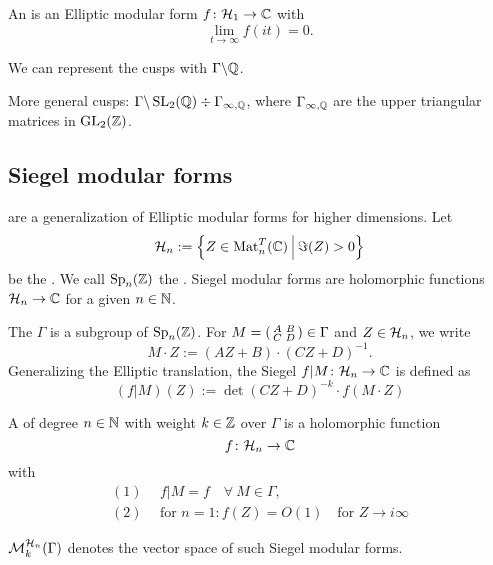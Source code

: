 An  is an Elliptic modular form $f \colon \mathcal{H}_1 \rightarrow \mathbb{C}$ with
\[ \lim_{t \rightarrow \infty} f(i t) = 0 . \]

We can represent the cusps with $\Gamma \backslash \mathbb{Q}$.

More general cusps: $\Gamma \backslash \operatorname{SL}_2(\mathbb{Q}) \div \Gamma_{\infty, \mathbb{Q}}$, where $\Gamma_{\infty, \mathbb{Q}}$ are the upper triangular matrices in $\operatorname{GL}_2(\mathbb{Z})$.


\subsection{Siegel modular forms}

 are a generalization of Elliptic modular forms for higher dimensions.
Let
\[ \SiegelHalfPlane_n := \Set{Z \in \M_n^T(\C)}{\Im(Z) > 0} \]
be the .
We call $\operatorname{Sp}_n(\mathbb{Z})$ the .
Siegel modular forms are holomorphic functions $\mathcal{H}_n \rightarrow \mathbb{C}$ for a given  $n \in \mathbb{N}$.

The  $\Gamma$ is a subgroup of $\operatorname{Sp}_n(\mathbb{Z})$. For $M = \left( \begin{smallmatrix} A & B \\ C & D \end{smallmatrix} \right) \in \Gamma$ and $Z \in \mathcal{H}_n$, we write
\[ M \cdot Z := (A Z + B) \cdot (C Z + D)^{-1} . \]
Generalizing the Elliptic translation, the Siegel  $f | M \colon \mathcal{H}_n \rightarrow \mathbb{C}$ is defined as   
\[ ( f | M ) (Z) :=
\det(CZ + D)^{-k} \cdot f(M \cdot Z) \]



A  of degree $n\in\mathbb{N}$ with weight $k \in \mathbb{Z}$ over $\Gamma$ is a holomorphic function
\[ f \colon \mathcal{H}_n \rightarrow \mathbb{C} \]
with
\begin{align*}
(1) \ \ & f|M = f \quad \forall \ M \in \Gamma, \\
(2) \ \ & \text{for } n = 1 \colon f(Z) = O(1) \quad \text{for } Z \rightarrow i \infty
\end{align*}

$\operatorname{\mathcal{M}}^{\mathcal{H}_{n}}_k (\Gamma)$ denotes the vector space of such Siegel modular forms.

